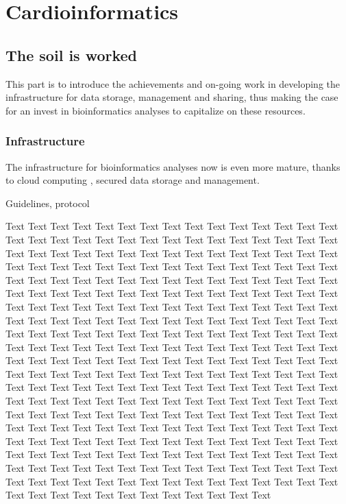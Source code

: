 \documentclass[letter]{bioinfo}
\begin{document}
%
\section{Cardioinformatics}

\subsection{The soil is worked}

This part is to introduce the achievements and on-going work in developing the infrastructure for data storage, management and sharing, thus making the case for an invest in bioinformatics analyses to capitalize on these resources.


\subsubsection{Infrastructure}

The infrastructure for bioinformatics analyses now is even more mature, thanks to cloud computing \citep{Langmead:2018:Cloud}, secured data storage and management.

Guidelines, protocol


Text Text Text Text Text Text  Text Text Text Text Text Text Text Text  Text Text Text Text Text Text Text Text  Text Text Text Text Text Text Text Text  Text Text Text Text Text Text Text Text  Text Text Text Text Text Text Text Text  Text Text Text Text Text Text Text Text  Text Text Text Text Text Text Text Text  Text Text Text Text Text Text Text Text  Text Text Text Text Text Text Text Text  Text Text Text Text Text Text Text Text  Text Text Text Text Text Text Text Text  Text Text Text Text Text Text Text Text  Text Text Text Text Text Text Text Text  Text Text Text Text Text Text Text Text  Text Text Text Text Text Text Text Text  Text Text Text Text Text Text Text Text  Text Text Text Text Text Text Text Text  Text Text Text Text Text Text Text Text  Text Text Text Text Text Text Text Text  Text Text Text Text Text Text Text Text  Text Text Text Text Text Text Text Text  Text Text Text Text Text Text Text Text  Text Text Text Text Text Text Text Text  Text Text Text Text Text Text Text Text  Text Text Text Text Text Text Text Text  Text Text Text Text Text Text Text Text  Text Text Text Text Text Text Text Text  Text Text Text Text Text Text Text Text  Text Text Text Text Text Text Text Text  Text Text Text Text Text Text Text Text  Text Text Text Text Text Text Text Text  Text Text Text Text Text Text Text Text  Text Text Text Text Text Text Text Text  Text Text Text Text Text Text Text Text  Text Text Text Text Text Text Text Text  Text Text Text Text Text Text Text Text  Text Text Text Text Text Text Text Text  Text Text Text Text Text Text Text Text  Text Text 
\end{document}
